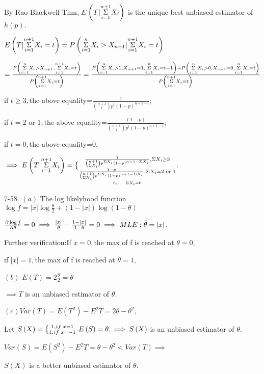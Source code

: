 \documentclass{article}
\def\QATOPD#1#2#3#4{{#3 \atopwithdelims#1#2 #4}}%
\begin{document}
\bigskip By Rao-Blackwell Thm, $E\left( T|\underset{i=1}{\overset{n+1}{%
\Sigma }}X_{i}\right) $ is the unique best unbiased estimator of $h\left(
p\right) .$

\bigskip $E\left( T|\underset{i=1}{\overset{n+1}{\Sigma }}X_{i}=t\right)
=P\left( \underset{i=1}{\overset{n}{\Sigma }}X_{i}>X_{n+1}|\underset{i=1}{%
\overset{n+1}{\Sigma }}X_{i}=t\right) $

$=\frac{P\left( \underset{i=1}{\overset{n}{\Sigma }}X_{i}>X_{n+1},\underset{%
i=1}{\overset{n+1}{\Sigma }}X_{i}=t\right) }{P\left( \underset{i=1}{\overset{%
n+1}{\Sigma }}X_{i}=t\right) }=\frac{P\left( \underset{i=1}{\overset{n}{%
\Sigma }}X_{i}>1,X_{n+1}=1,\underset{i=1}{\overset{n}{\Sigma }}%
X_{i}=t-1\right) +P\left( \underset{i=1}{\overset{n}{\Sigma }}%
X_{i}>0,X_{n+1}=0,\underset{i=1}{\overset{n}{\Sigma }}X_{i}=t\right) }{%
P\left( \underset{i=1}{\overset{n+1}{\Sigma }}X_{i}=t\right) }$

if $t\geq 3,$the above equality=$\frac{1}{\binom{n+1}{t}p^{t}\left(
1-p\right) ^{n+1-t}};$

if $t=2$ or 1$,$the above equality=$\frac{\left( 1-p\right) }{\binom{n+1}{t}%
p^{t}\left( 1-p\right) ^{n+1-t}};$

if $t=0,$the above equality=0.

$\implies E\left( T|\underset{i=1}{\overset{n+1}{\Sigma }}X_{i}\right)
=\QATOPD\{ . {\frac{1}{\binom{n+1}{\Sigma X_{i}}p^{\Sigma X_{i}}\left(
1-p\right) ^{n+1-\Sigma X_{i}}},\Sigma X_{i}\geq 3}{\underset{0,\text{ \ \ \
\ }\Sigma X_{i}=0}{\frac{1-p}{\binom{n+1}{\Sigma X_{i}}p^{\Sigma
X_{i}}\left( 1-p\right) ^{n+1-\Sigma X_{i}}},\Sigma X_{i}=2\text{ or 1}}}.$

7-58. $\left( a\right) $ The log likelyhood function $\log f=\left\vert
x\right\vert \log \frac{\theta }{2}+\left( 1-\left\vert x\right\vert \right)
\log \left( 1-\theta \right) $

$\bigskip \frac{\partial \log f}{\partial \theta }=0\implies \frac{%
\left\vert x\right\vert }{\theta }-\frac{1-\left\vert x\right\vert }{%
1-\theta }=0\implies MLE:\hat{\theta}=\left\vert x\right\vert .$

Further verification:If $x=0,$the max of f is reached at $\theta =0,$

if $\left\vert x\right\vert =1,$the max of f is reached at $\theta =1,$

$\left( b\right) $ $E\left( T\right) =2\frac{\theta }{2}=\theta $

$\implies T$ is an unbiased estimator of $\theta .$

$\left( c\right) Var\left( T\right) =E\left( T^{2}\right) -E^{2}T=2\theta
-\theta ^{2},$

Let $S\left( X\right) =\QATOPD\{ . {1,if\text{ }x=1}{1,if\text{ }%
x=-1}.E\left( S\right) =\theta ,\implies S\left( X\right) $ is an unbiased
estimator of $\theta .$

$Var\left( S\right) =E\left( S^{2}\right) -E^{2}T=\theta -\theta
^{2}<Var\left( T\right) \implies $

$S\left( X\right) $ is a better unbiased estimator of $\theta .$
\end{document}
